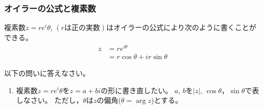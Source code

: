 \documentclass[twocolumn,11pt]{jarticle}
\begin{document}
\subsubsection{オイラーの公式と複素数\label{sec:Euler-complex}}

複素数$z=re^i{\theta}$, $(rは正の実数)$はオイラーの公式により次のように書くことができる。
\begin{align*}
  z&=re^{i\theta}\\
  &=r\cos\theta+ir\sin\theta
\end{align*}

\nquestion 以下の問いに答えなさい。
\begin{enumerate}
\item 複素数$z=re^i{\theta}$を$z=a+bi$の形に書き直したい。
$a$, $b$を$|z|$, $\cos\theta$，$\sin\theta$で表しなさい。
ただし，$\theta$は$z$の偏角($\theta=\arg z$)とする。


\end{enumerate}
\end{document}
